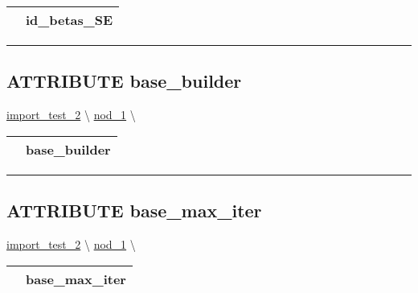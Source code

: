 {\renewcommand{\arraystretch}{1.5}
\begin{tabularx}{\textwidth}{|>{\raggedright\arraybackslash}l|X|}
\hline
\hspace{0pt}\mytexttt{\color{red} } & \textbf{id\_betas\_SE} \\
\hline
\end{tabularx}
}

\par


\rule{\linewidth}{0.5pt}
\subsection*{\textsf{\colorbox{headtoc}{\color{white} ATTRIBUTE}
base\_builder}}

\hypertarget{ecldoc:constants.base_builder}{}
\hspace{0pt} \hyperlink{ecldoc:import_test_2}{import_test_2} \textbackslash 
\hspace{0pt} \hyperlink{ecldoc:Constants}{nod_1} \textbackslash 

{\renewcommand{\arraystretch}{1.5}
\begin{tabularx}{\textwidth}{|>{\raggedright\arraybackslash}l|X|}
\hline
\hspace{0pt}\mytexttt{\color{red} } & \textbf{base\_builder} \\
\hline
\end{tabularx}
}

\par


\rule{\linewidth}{0.5pt}
\subsection*{\textsf{\colorbox{headtoc}{\color{white} ATTRIBUTE}
base\_max\_iter}}

\hypertarget{ecldoc:constants.base_max_iter}{}
\hspace{0pt} \hyperlink{ecldoc:import_test_2}{import_test_2} \textbackslash 
\hspace{0pt} \hyperlink{ecldoc:Constants}{nod_1} \textbackslash 

{\renewcommand{\arraystretch}{1.5}
\begin{tabularx}{\textwidth}{|>{\raggedright\arraybackslash}l|X|}
\hline
\hspace{0pt}\mytexttt{\color{red} } & \textbf{base\_max\_iter} \\
\hline
\end{tabularx}
}

